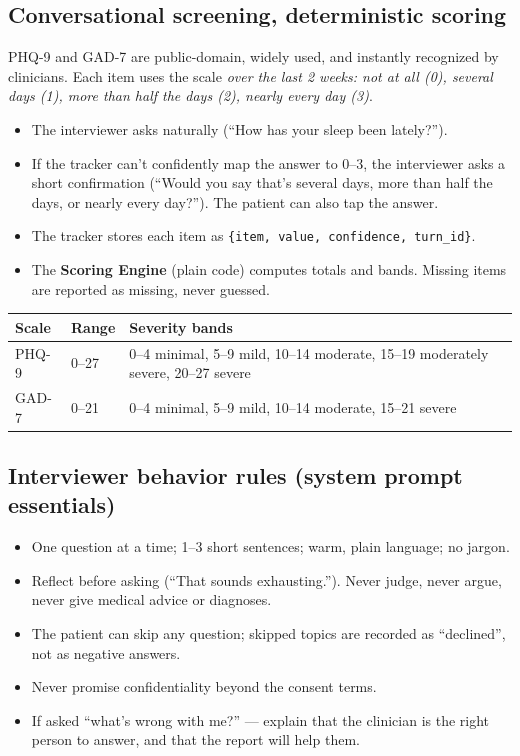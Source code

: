 \documentclass[11pt]{article}
\begin{document}
\subsection{Conversational screening, deterministic scoring}
PHQ-9 and GAD-7 are public-domain, widely used, and instantly recognized by clinicians. Each item uses the scale
\emph{over the last 2 weeks: not at all (0), several days (1), more than half the days (2), nearly every day (3)}.
\begin{itemize}
  \item The interviewer asks naturally (``How has your sleep been lately?'').
  \item If the tracker can't confidently map the answer to 0--3, the interviewer asks a short confirmation
        (``Would you say that's several days, more than half the days, or nearly every day?''). The patient can also tap the answer.
  \item The tracker stores each item as \texttt{\{item, value, confidence, turn\_id\}}.
  \item The \textbf{Scoring Engine} (plain code) computes totals and bands. Missing items are reported as missing, never guessed.
\end{itemize}

\begin{center}
\small
\begin{tabular}{@{}lll@{}}
\toprule
\textbf{Scale} & \textbf{Range} & \textbf{Severity bands} \\
\midrule
PHQ-9 & 0--27 & 0--4 minimal, 5--9 mild, 10--14 moderate, 15--19 moderately severe, 20--27 severe \\
GAD-7 & 0--21 & 0--4 minimal, 5--9 mild, 10--14 moderate, 15--21 severe \\
\bottomrule
\end{tabular}
\end{center}

\subsection{Interviewer behavior rules (system prompt essentials)}
\begin{itemize}
  \item One question at a time; 1--3 short sentences; warm, plain language; no jargon.
  \item Reflect before asking (``That sounds exhausting.''). Never judge, never argue, never give medical advice or diagnoses.
  \item The patient can skip any question; skipped topics are recorded as ``declined'', not as negative answers.
  \item Never promise confidentiality beyond the consent terms.
  \item If asked ``what's wrong with me?'' --- explain that the clinician is the right person to answer, and that the report will help them.
\end{itemize}
\end{document}

